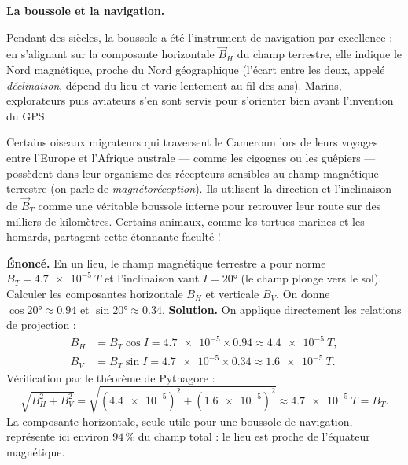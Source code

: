 \documentclass[11pt]{article}
\begin{document}
\textbf{La boussole et la navigation.}\par

Pendant des siècles, la boussole a été l'instrument de navigation par excellence : en s'alignant sur la composante horizontale $\vec{B}_H$ du champ terrestre, elle indique le Nord magnétique, proche du Nord géographique (l'écart entre les deux, appelé \emph{déclinaison}, dépend du lieu et varie lentement au fil des ans). Marins, explorateurs puis aviateurs s'en sont servis pour s'orienter bien avant l'invention du GPS.

\begin{savaistu}
Certains oiseaux migrateurs qui traversent le Cameroun lors de leurs voyages entre l'Europe et l'Afrique australe — comme les cigognes ou les guêpiers — possèdent dans leur organisme des récepteurs sensibles au champ magnétique terrestre (on parle de \emph{magnétoréception}). Ils utilisent la direction et l'inclinaison de $\vec{B}_T$ comme une véritable boussole interne pour retrouver leur route sur des milliers de kilomètres. Certains animaux, comme les tortues marines et les homards, partagent cette étonnante faculté !
\end{savaistu}

\begin{exoresolu}
\textbf{Énoncé.} En un lieu, le champ magnétique terrestre a pour norme $B_T = \SI{4,7e-5}{T}$ et l'inclinaison vaut $I = 20°$ (le champ plonge vers le sol). Calculer les composantes horizontale $B_H$ et verticale $B_V$. On donne $\cos 20° \approx \num{0,94}$ et $\sin 20° \approx \num{0,34}$.
\tcblower
\textbf{Solution.} On applique directement les relations de projection :
\begin{align*}
B_H &= B_T \cos I = \num{4,7e-5} \times \num{0,94} \approx \SI{4,4e-5}{T}, \\
B_V &= B_T \sin I = \num{4,7e-5} \times \num{0,34} \approx \SI{1,6e-5}{T}.
\end{align*}
Vérification par le théorème de Pythagore :
\[ \sqrt{B_H^2 + B_V^2} = \sqrt{(\num{4,4e-5})^2 + (\num{1,6e-5})^2} \approx \SI{4,7e-5}{T} = B_T. \]
La composante horizontale, seule utile pour une boussole de navigation, représente ici environ $94\,\%$ du champ total : le lieu est proche de l'équateur magnétique.
\end{exoresolu}
\end{document}
